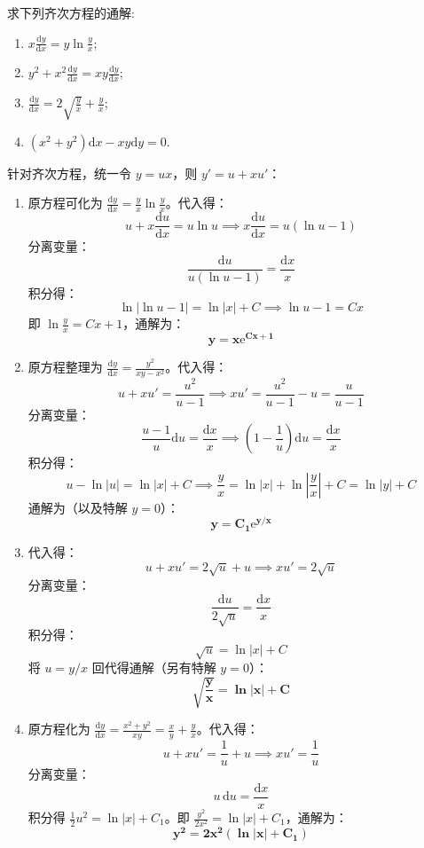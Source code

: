 \documentclass[lang=cn,11pt]{elegantbook}
\begin{document}
\begin{exercise}[求解齐次方程]
求下列齐次方程的通解:
\begin{enumerate}
    \item[(1)] $\displaystyle x\frac{\mathrm{d}y}{\mathrm{d}x}=y\ln\frac{y}{x}$;
    \item[(2)] $\displaystyle y^2+x^2\frac{\mathrm{d}y}{\mathrm{d}x}=xy\frac{\mathrm{d}y}{\mathrm{d}x}$;
    \item[(3)] $\displaystyle \frac{\mathrm{d}y}{\mathrm{d}x}=2\sqrt{\frac{y}{x}}+\frac{y}{x}$;
    \item[(4)] $\displaystyle (x^2+y^2)\mathrm{d}x-xy\mathrm{d}y=0$.
\end{enumerate}
\end{exercise}
\begin{solution}
针对齐次方程，统一令 $y=ux$，则 $y' = u + xu'$：
\begin{enumerate}
    \item[(1)] 原方程可化为 $\displaystyle\frac{\mathrm{d}y}{\mathrm{d}x} = \frac{y}{x}\ln\frac{y}{x}$。代入得：
    \[
    u + x\frac{\mathrm{d}u}{\mathrm{d}x} = u\ln u \implies x\frac{\mathrm{d}u}{\mathrm{d}x} = u(\ln u - 1)
    \]
    分离变量：
    \[
    \frac{\mathrm{d}u}{u(\ln u - 1)} = \frac{\mathrm{d}x}{x}
    \]
    积分得：
    \[
    \ln|\ln u - 1| = \ln|x| + C \implies \ln u - 1 = Cx
    \]
    即 $\ln\frac{y}{x} = Cx+1$，通解为：
    \[
    \mathbf{y = x\mathrm{e}^{Cx+1}}
    \]
    
    \item[(2)] 原方程整理为 $\displaystyle\frac{\mathrm{d}y}{\mathrm{d}x} = \frac{y^2}{xy-x^2}$。代入得：
    \[
    u + xu' = \frac{u^2}{u-1} \implies xu' = \frac{u^2}{u-1} - u = \frac{u}{u-1}
    \]
    分离变量：
    \[
    \frac{u-1}{u}\mathrm{d}u = \frac{\mathrm{d}x}{x} \implies \left(1 - \frac{1}{u}\right)\mathrm{d}u = \frac{\mathrm{d}x}{x}
    \]
    积分得：
    \[
    u - \ln|u| = \ln|x| + C \implies \frac{y}{x} = \ln|x| + \ln\left|\frac{y}{x}\right| + C = \ln|y| + C
    \]
    通解为（以及特解 $y=0$）：
    \[
    \mathbf{y = C_1\mathrm{e}^{y/x}}
    \]
    
    \item[(3)] 代入得：
    \[
    u + xu' = 2\sqrt{u} + u \implies xu' = 2\sqrt{u}
    \]
    分离变量：
    \[
    \frac{\mathrm{d}u}{2\sqrt{u}} = \frac{\mathrm{d}x}{x}
    \]
    积分得：
    \[
    \sqrt{u} = \ln|x| + C
    \]
    将 $u=y/x$ 回代得通解（另有特解 $y=0$）：
    \[
    \mathbf{\sqrt{\frac{y}{x}} = \ln|x| + C}
    \]
    
    \item[(4)] 原方程化为 $\displaystyle\frac{\mathrm{d}y}{\mathrm{d}x} = \frac{x^2+y^2}{xy} = \frac{x}{y} + \frac{y}{x}$。代入得：
    \[
    u + xu' = \frac{1}{u} + u \implies xu' = \frac{1}{u}
    \]
    分离变量：
    \[
    u\,\mathrm{d}u = \frac{\mathrm{d}x}{x}
    \]
    积分得 $\frac{1}{2}u^2 = \ln|x| + C_1$。即 $\frac{y^2}{2x^2} = \ln|x| + C_1$，通解为：
    \[
    \mathbf{y^2 = 2x^2(\ln|x| + C_1)}
    \]
\end{enumerate}
\end{solution}
\end{document}
